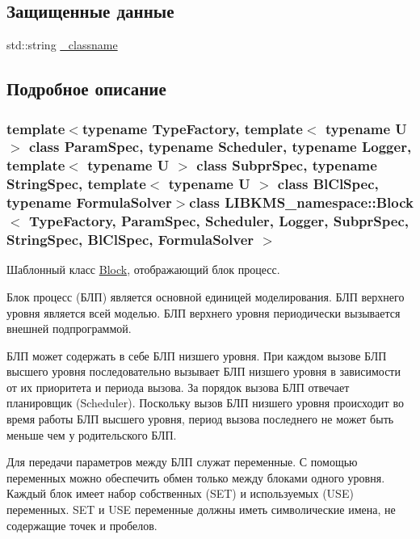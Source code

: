 \subsection*{Защищенные данные}
\begin{DoxyCompactItemize}
\item 
std\-::string \hyperlink{classLIBKMS__namespace_1_1Block_a1d39e7d7bc913e6ed550677602e74e50}{\-\_\-classname}
\end{DoxyCompactItemize}


\subsection{Подробное описание}
\subsubsection*{template$<$typename Type\-Factory, template$<$ typename U $>$ class Param\-Spec, typename Scheduler, typename Logger, template$<$ typename U $>$ class Subpr\-Spec, typename String\-Spec, template$<$ typename U $>$ class Bl\-Cl\-Spec, typename Formula\-Solver$>$class L\-I\-B\-K\-M\-S\-\_\-namespace\-::\-Block$<$ Type\-Factory, Param\-Spec, Scheduler, Logger, Subpr\-Spec, String\-Spec, Bl\-Cl\-Spec, Formula\-Solver $>$}

Шаблонный класс \hyperlink{classLIBKMS__namespace_1_1Block}{Block}, отображающий блок процесс. 

\begin{quotation}


\end{quotation}
Блок процесс (БЛП) является основной единицей моделирования. БЛП верхнего уровня является всей моделью. БЛП верхнего уровня периодически вызывается внешней подпрограммой.

БЛП может содержать в себе БЛП низшего уровня. При каждом вызове БЛП высшего уровня последовательно вызывает БЛП низшего уровня в зависимости от их приоритета и периода вызова. За порядок вызова БЛП отвечает планировщик (Scheduler). Поскольку вызов БЛП низшего уровня происходит во время работы БЛП высшего уровня, период вызова последнего не может быть меньше чем у родительского БЛП.

Для передачи параметров между БЛП служат переменные. С помощью переменных можно обеспечить обмен только между блоками одного уровня. Каждый блок имеет набор собственных (S\-E\-T) и используемых (U\-S\-E) переменных. S\-E\-T и U\-S\-E переменные должны иметь символические имена, не содержащие точек и пробелов.

